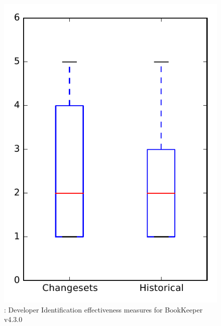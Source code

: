 
\begin{figure}
\centering
\includegraphics[height=0.4\textheight]{figures/dit/rq2_bookkeeper}
\caption{\dtwo: Developer Identification effectiveness measures for BookKeeper v4.3.0}
\label{fig:dit:rq2:bookkeeper}
\end{figure}
